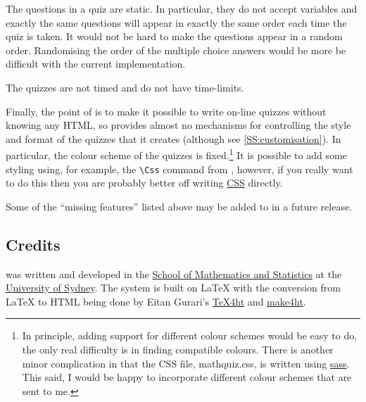 \documentclass[svgnames]{article}
\begin{document}
    The questions in a \MathQuiz quiz are static. In particular, they do
    not accept variables and exactly the same questions will appear in
    exactly the same order each time the quiz is taken. It would not be
    hard to make the questions appear in a random order. Randomising the
    order of the multiple choice answers would be more be difficult with
    the current implementation.

    The quizzes are not timed and do not have time-limits.

    Finally, the point of \MathQuiz is to make it possible to write
    on-line quizzes without knowing any HTML, so \MathQuiz provides
    almost no mechanisms for controlling the style and format of the
    quizzes that it creates (although see \autoref{SS:customisation}).
    In particular, the colour scheme of the quizzes is
    fixed.\footnote{In principle, adding support for different colour
    schemes would be easy to do, the only real difficulty is in finding
    compatible colours. There is another minor complication in that the
    \MathQuiz CSS file, \textsf{mathquiz.css}, is written using
    \href{http://sass-lang.com/}{sass}. This said, I would be happy to
    incorporate different colour schemes that are sent to me.}
    It is possible to add some styling using, for example, the
    \Verb|\Css| command from , however, if you really want
    to do this then you are probably better off writing
    \href{https://www.w3schools.com/css/}{CSS} directly.

    Some of the ``missing features'' listed above may be added to \MathQuiz in a future release.

\subsection{Credits}
    \MathQuiz{} was written and developed in the
    \href{http://www.maths.usyd.edu.au/}{School of Mathematics and
    Statistics} at the \href{http://www.usyd.edu.au/}{University of
    Sydney}.  The system is built on \LaTeX{} with the conversion from
    \LaTeX{} to HTML being done by Eitan Gurari's
    \href{http://www.cis.ohio-state.edu/~gurari/TeX4ht/mn.html}{TeX4ht}
    and
    \href{https://github.com/michal-h21/make4ht}{make4ht}.
\end{document}
